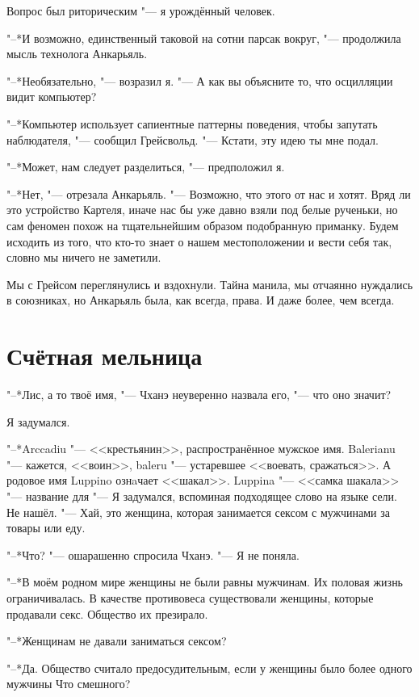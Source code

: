 \documentclass[a4paper,10pt]{book}
\newcommand{\ldotst}{\so{...}\xspace}
\begin{document}
Вопрос был риторическим "--- я урождённый человек.

"--*И возможно, единственный таковой на сотни парсак вокруг, "--- продолжила 
мысль технолога Анкарьяль.

"--*Необязательно, "--- возразил я. "--- А как вы объясните то, что осцилляции 
видит компьютер?

"--*Компьютер использует сапиентные паттерны поведения, чтобы запутать 
наблюдателя, "--- сообщил Грейсвольд. "--- Кстати, эту идею ты мне подал.

"--*Может, нам следует разделиться, "--- предположил я.

"--*Нет, "--- отрезала Анкарьяль. "--- Возможно, что этого от нас и хотят. Вряд 
ли это устройство Картеля, иначе нас бы уже давно взяли под белые рученьки, 
но сам феномен похож на тщательнейшим образом подобранную приманку. Будем 
исходить из того, что кто-то знает о нашем местоположении\ldotst и вести себя 
так, словно мы ничего не заметили.

Мы с Грейсом переглянулись и вздохнули. Тайна манила, мы отчаянно нуждались в 
союзниках, но Анкарьяль была, как всегда, права. И даже более, чем всегда. 

\section{Счётная мельница}

"--*Лис, а то твоё имя, "--- Чханэ неуверенно назвала его, "--- что оно значит?

Я задумался.

"--*Arccadiu "--- <<крестьянин>>, распространённое мужское имя. Balerianu "--- 
кажется, <<воин>>, baleru "--- устаревшее <<воевать, сражаться>>. А родовое имя 
Luppino ознaчает <<шакал>>. Luppina "--- <<самка шакала>> "--- название 
для\ldotst 
"--- Я задумался, вспоминая подходящее слово на языке сели. Не нашёл. "--- Хай, 
это женщина, которая занимается сексом с мужчинами за товары или еду.

"--*Что? "--- ошарашенно спросила Чханэ. "--- Я не поняла.

"--*В моём родном мире женщины не были равны мужчинам. Их половая жизнь 
ограничивалась. В качестве противовеса существовали женщины, которые продавали 
секс. Общество их презирало.

"--*Женщинам не давали заниматься сексом?

"--*Да. Общество считало предосудительным, если у женщины было более одного 
мужчины\ldotst Что смешного?
\end{document}
